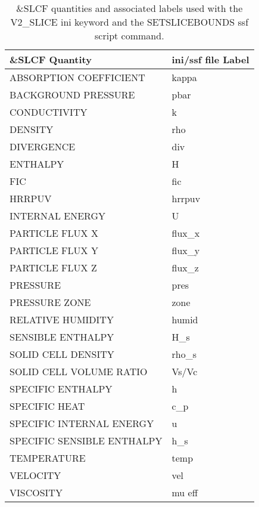 \begin{table}[bph]
\begin{center}
\caption{\&SLCF quantities and associated labels used with the V2\_SLICE ini keyword and the SETSLICEBOUNDS ssf script command.}
\vspace{0.1in}
\begin{tabular}{|l|l|}
\hline
\&SLCF Quantity & ini/ssf file Label \\ \hline
 ABSORPTION COEFFICIENT  &   kappa \\ \hline
 BACKGROUND PRESSURE  &   pbar \\ \hline
 CONDUCTIVITY  &   k \\ \hline
 DENSITY  &   rho \\ \hline
 DIVERGENCE  &   div \\ \hline
 ENTHALPY  &   H \\ \hline
 FIC  &   fic \\ \hline
 HRRPUV  &   hrrpuv \\ \hline
 INTERNAL ENERGY  &   U \\ \hline
 PARTICLE FLUX X  &   flux\_x \\ \hline
 PARTICLE FLUX Y  &   flux\_y \\ \hline
 PARTICLE FLUX Z  &   flux\_z \\ \hline
 PRESSURE  &   pres \\ \hline
 PRESSURE ZONE  &   zone \\ \hline
 RELATIVE HUMIDITY  &   humid \\ \hline
 SENSIBLE ENTHALPY  &   H\_s \\ \hline
 SOLID CELL DENSITY  &   rho\_s \\ \hline
 SOLID CELL VOLUME RATIO  &   Vs/Vc \\ \hline
 SPECIFIC ENTHALPY  &   h \\ \hline
 SPECIFIC HEAT  &   c\_p \\ \hline
 SPECIFIC INTERNAL ENERGY  &   u \\ \hline
 SPECIFIC SENSIBLE ENTHALPY  &   h\_s \\ \hline
 TEMPERATURE  &   temp \\ \hline
 VELOCITY  &   vel \\ \hline
 VISCOSITY  &   mu eff \\ \hline
\end{tabular}
\label{tabSLCF}
\end{center}
\end{table}
